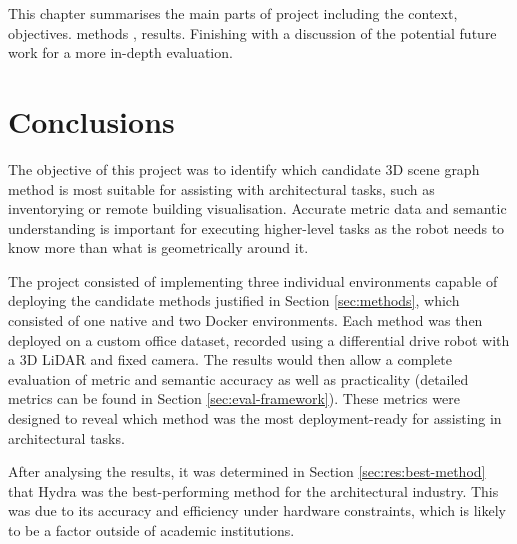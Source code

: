 %

This chapter summarises the main parts of project including the context, objectives. methods , results. Finishing with a discussion of the potential future work for a more in-depth evaluation.


\section{Conclusions}\label{sec:conclusions}

The objective of this project was to identify which candidate 3D scene graph method is most suitable for assisting with architectural tasks, such as inventorying or remote building visualisation. Accurate metric data and semantic understanding is important for executing higher-level tasks as the robot needs to know more than what is geometrically around it.

The project consisted of implementing three individual environments capable of deploying the candidate methods justified in Section \ref{sec:methods}, which consisted of one native and two Docker environments. Each method was then deployed on a custom office dataset, recorded using a differential drive robot with a 3D LiDAR and fixed camera. The results would then allow a complete evaluation of metric and semantic accuracy as well as practicality (detailed metrics can be found in Section \ref{sec:eval-framework}). These metrics were designed to reveal which method was the most deployment-ready for assisting in architectural tasks.

After analysing the results, it was determined in Section \ref{sec:res:best-method} that Hydra was the best-performing method for the architectural industry. This was due to its accuracy and efficiency under hardware constraints, which is likely to be a factor outside of academic institutions.


